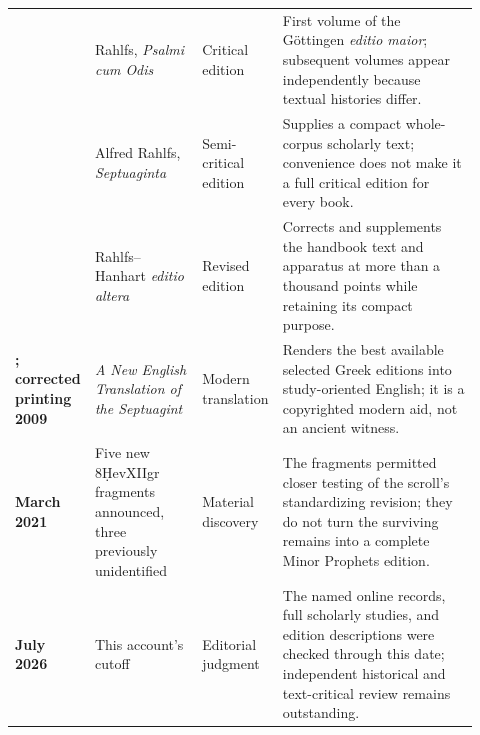 \begin{longtable}{>{\bfseries\RaggedRight\arraybackslash}p{0.14\linewidth}>{\RaggedRight\arraybackslash}p{0.23\linewidth}>{\RaggedRight\arraybackslash}p{0.13\linewidth}>{\RaggedRight\arraybackslash}p{0.42\linewidth}}
1931 & Rahlfs, \emph{Psalmi cum Odis} & Critical edition & First volume of the G\"ottingen \emph{editio maior}; subsequent volumes appear independently because textual histories differ.\\
1935 & Alfred Rahlfs, \emph{Septuaginta} & Semi-critical edition & Supplies a compact whole-corpus scholarly text; convenience does not make it a full critical edition for every book.\\
2006 & Rahlfs--Hanhart \emph{editio altera} & Revised edition & Corrects and supplements the handbook text and apparatus at more than a thousand points while retaining its compact purpose.\\
2007; corrected printing 2009 & \emph{A New English Translation of the Septuagint} & Modern translation & Renders the best available selected Greek editions into study-oriented English; it is a copyrighted modern aid, not an ancient witness.\\
March 2021 & Five new 8\d{H}evXIIgr fragments announced, three previously unidentified & Material discovery & The fragments permitted closer testing of the scroll's standardizing revision; they do not turn the surviving remains into a complete Minor Prophets edition.\\
17 July 2026 & This account's cutoff & Editorial judgment & The named online records, full scholarly studies, and edition descriptions were checked through this date; independent historical and text-critical review remains outstanding.\\
\end{longtable}
